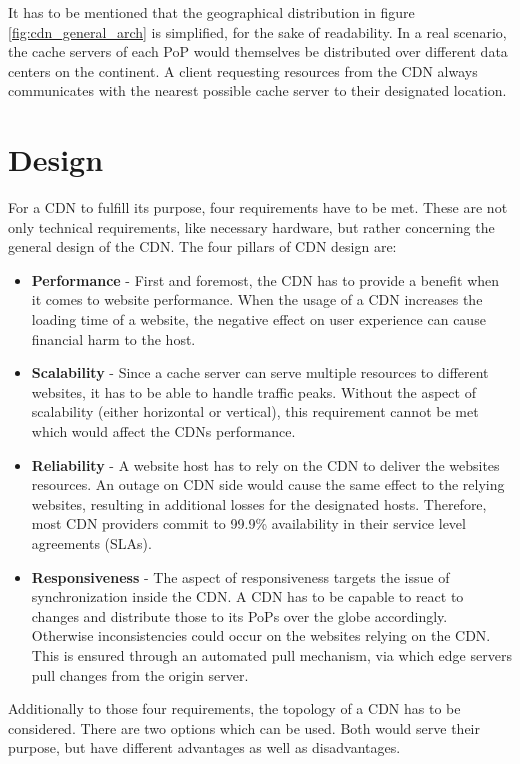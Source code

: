 It has to be mentioned that the geographical distribution in figure \ref{fig:cdn_general_arch} is simplified, for the sake of readability. In a real scenario, the cache servers of each PoP would themselves be distributed over different data centers on the continent. A client requesting resources from the CDN always communicates with the nearest possible cache server to their designated location.\cite{cdn_general}

\section{Design}

For a CDN to fulfill its purpose, four requirements have to be met. These are not only technical requirements, like necessary hardware, but rather concerning the general design of the CDN.
The four pillars of CDN design are:

\begin{itemize}
	\item \textbf{Performance} - First and foremost, the CDN has to provide a benefit when it comes to website performance. When the usage of a CDN increases the loading time of a website, the negative effect on user experience can cause financial harm to the host.\cite{cdn_general}
	\item \textbf{Scalability} - Since a cache server can serve multiple resources to different websites, it has to be able to handle traffic peaks. Without the aspect of scalability (either horizontal or vertical), this requirement cannot be met which would affect the CDNs performance.
	\item \textbf{Reliability} -  A website host has to rely on the CDN to deliver the websites resources. An outage on CDN side would cause the same effect to the relying websites, resulting in additional losses for the designated hosts. Therefore, most CDN providers commit to 99.9\% availability in their service level agreements (SLAs).
	\item \textbf{Responsiveness} -  The aspect of responsiveness targets the issue of synchronization inside the CDN. A CDN has to be capable to react to changes and distribute those to its PoPs over the globe accordingly. Otherwise inconsistencies could occur on the websites relying on the CDN. This is ensured through an automated pull mechanism, via which edge servers pull changes from the origin server.\cite{cdn_origin_server}
\end{itemize}

Additionally to those four requirements, the topology of a CDN has to be considered. There are two options which can be used. Both would serve their purpose, but have different advantages as well as disadvantages. 

